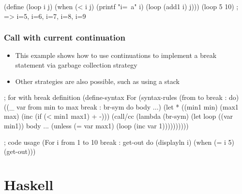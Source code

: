 \documentclass[a4paper,landscape,10pt]{article}
\begin{document}
\begin{multicols*}{2}
  \begin{racket}
(define (loop i j)
  (when (< i j)
    (printf "i=~a\n" i)
    (loop (add1 i) j)))
(loop 5 10) ; => i=5, i=6, i=7, i=8, i=9
  \end{racket}

  \subsubsection{Call with current continuation}

  \begin{itemize}
    \item This example shows how to use continuations to implement a break statement via garbage collection strategy
    \item Other strategies are also possible, such as using a stack
  \end{itemize}

  \begin{racket}
; for with break definition
(define-syntax For
  (syntax-rules (from to break : do)
    ((_ var from min to max break : br-sym do body ...)
    (let * ((min1 min)
      (max1 max)
      (inc (if (< min1 max1) + -)))
    (call/cc (lambda (br-sym)
      (let loop ((var min1))
        body ...
        (unless (= var max1)
          (loop (inc var 1))))))))))

; code usage
(For i from 1 to 10 break : get-out
  do (displayln i)
    (when (= i 5)
      (get-out)))
  \end{racket}

\end{multicols*}

\clearpage

\section{Haskell}
\end{document}
